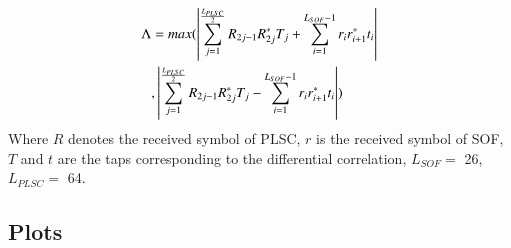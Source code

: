 \documentclass[journal,12pt,twocolumn]{IEEEtran}
\begin{document}
\begin{align}
\Lambda&= max(\left\vert\sum_{j=1}^{\frac{L_{PLSC}}{2}}R_{2j-1}R^*_{2j}T_j+\sum_{i=1}^{L_{SOF}-1}r_i r_{i+1}^*t_i\right\vert\\
&,\left\vert\sum_{j=1}^{\frac{L_{PLSC}}{2}}R_{2j-1}R^*_{2j}T_j-\sum_{i=1}^{L_{SOF}-1}r_i r_{i+1}^*t_i\right\vert)
\end{align}
Where $R$ denotes the received symbol of PLSC, $r$ is the
received symbol of SOF, $T$ and $t$ are the taps corresponding to the differential correlation, $L_{SOF} =$ 26, $L_{PLSC}=$ 64.
\subsection{Plots}


%

%
%
%
%
\end{document}
